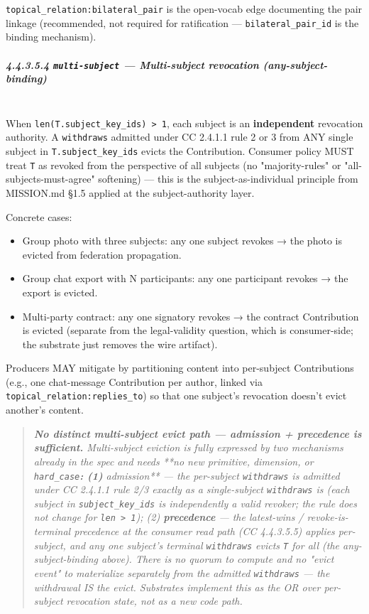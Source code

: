 \documentclass[11pt]{article}
\begin{document}
\texttt{topical\_relation:bilateral\_pair} is the open-vocab edge documenting the pair linkage (recommended, not required for ratification — \texttt{bilateral\_pair\_id} is the binding mechanism).


\subparagraph{4.4.3.5.4 \texttt{multi-subject} — Multi-subject revocation (any-subject-binding)}\mbox{}\\


When \texttt{len(T.subject\_key\_ids) > 1}, each subject is an \textbf{independent} revocation authority. A \texttt{withdraws} admitted under CC 2.4.1.1 rule 2 or 3 from ANY single subject in \texttt{T.subject\_key\_ids} evicts the Contribution. Consumer policy MUST treat \texttt{T} as revoked from the perspective of all subjects (no "majority-rules" or "all-subjects-must-agree" softening) — this is the subject-as-individual principle from MISSION.md §1.5 applied at the subject-authority layer.


Concrete cases:

\begin{itemize}\setlength\itemsep{0pt}
\item Group photo with three subjects: any one subject revokes → the photo is evicted from federation propagation.
\item Group chat export with N participants: any one participant revokes → the export is evicted.
\item Multi-party contract: any one signatory revokes → the contract Contribution is evicted (separate from the legal-validity question, which is consumer-side; the substrate just removes the wire artifact).
\end{itemize}


Producers MAY mitigate by partitioning content into per-subject Contributions (e.g., one chat-message Contribution per author, linked via \texttt{topical\_relation:replies\_to}) so that one subject's revocation doesn't evict another's content.


\begin{quote}\itshape \textbf{No distinct multi-subject evict path — admission + precedence is sufficient.} Multi-subject eviction is fully expressed by two mechanisms already in the spec and needs **no new primitive, dimension, or \texttt{hard\_case}\textbf{: (1) }admission** — the per-subject \texttt{withdraws} is admitted under CC 2.4.1.1 rule 2/3 exactly as a single-subject \texttt{withdraws} is (each subject in \texttt{subject\_key\_ids} is independently a valid revoker; the rule does not change for \texttt{len > 1}); (2) \textbf{precedence} — the latest-wins / revoke-is-terminal precedence at the consumer read path (CC 4.4.3.5.5) applies per-subject, and any one subject's terminal \texttt{withdraws} evicts \texttt{T} for all (the any-subject-binding above). There is no quorum to compute and no "evict event" to materialize separately from the admitted \texttt{withdraws} — the withdrawal IS the evict. Substrates implement this as the OR over per-subject revocation state, not as a new code path.\end{quote}
\end{document}
